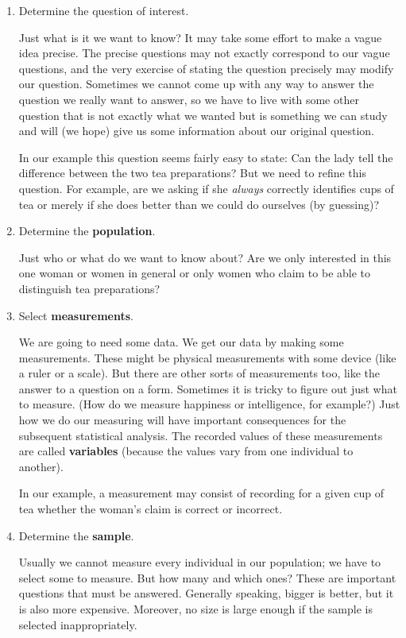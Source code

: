 \documentclass[]{book}
\begin{document}
\begin{enumerate}
\item
  Determine the question of interest.

  Just what is it we want to know? It may take some effort to make a vague idea precise. The precise questions may not exactly correspond to our vague questions, and the very exercise of stating the question precisely may modify our question. Sometimes we cannot come up with any way to answer the question we really want to answer, so we have to live with some other question that is not exactly what we wanted but is something we can study and will (we hope) give us some information about our original question.

  In our example this question seems fairly easy to state: Can the lady tell the difference between the two tea preparations? But we need to refine this question. For example, are we asking if she \emph{always} correctly identifies cups of tea or merely if she does better than we could do ourselves (by guessing)?
\item
  Determine the \textbf{population}.

  Just who or what do we want to know about? Are we only interested in this one woman or women in general or only women who claim to be able to distinguish tea preparations?
\item
  Select \textbf{measurements}.

  We are going to need some data. We get our data by making some measurements. These might be physical measurements with some device (like a ruler or a scale). But there are other sorts of measurements too, like the answer to a question on a form. Sometimes it is tricky to figure out just what to measure. (How do we measure happiness or intelligence, for example?) Just how we do our measuring will have important consequences for the subsequent statistical analysis. The recorded values of these measurements are called \textbf{variables} (because the values vary from one individual to another).

  In our example, a measurement may consist of recording for a given cup of tea whether the woman's claim is correct or incorrect.
\item
  Determine the \textbf{sample}.

  Usually we cannot measure every individual in our population; we have to select some to measure. But how many and which ones? These are important questions that must be answered. Generally speaking, bigger is better, but it is also more expensive. Moreover, no size is large enough if the sample is selected inappropriately.


\end{enumerate}
\end{document}
